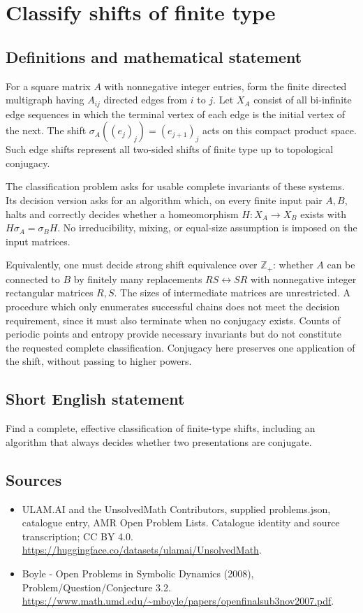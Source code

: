 \documentclass[11pt,a4paper]{article}
\begin{document}
\section*{Classify shifts of finite type}\label{statement}

\subsection{Definitions and mathematical statement}
For a square matrix $A$ with nonnegative integer entries, form the finite
directed multigraph having $A_{ij}$ directed edges from $i$ to $j$. Let
$X_A$ consist of all bi-infinite edge sequences in which the terminal
vertex of each edge is the initial vertex of the next. The shift
$\sigma_A((e_j)_j)=(e_{j+1})_j$ acts on this compact product space.
Such edge shifts represent all two-sided shifts of finite type up to
topological conjugacy.

The classification problem asks for usable complete invariants of these
systems. Its decision version asks for an algorithm which, on every finite
input pair $A,B$, halts and correctly decides whether a homeomorphism
$H:X_A\to X_B$ exists with $H\sigma_A=\sigma_BH$. No irreducibility,
mixing, or equal-size assumption is imposed on the input matrices.

Equivalently, one must decide strong shift equivalence over $\mathbb Z_+$:
whether $A$ can be connected to $B$ by finitely many replacements
$RS\leftrightarrow SR$ with nonnegative integer rectangular matrices $R,S$.
The sizes of intermediate matrices are unrestricted. A procedure which only
enumerates successful chains does not meet the decision requirement, since
it must also terminate when no conjugacy exists. Counts of periodic points
and entropy provide necessary invariants but do not constitute the requested
complete classification. Conjugacy here preserves one application of the
shift, without passing to higher powers.
\subsection{Short English statement}
Find a complete, effective classification of finite-type shifts, including an algorithm that always decides whether two presentations are conjugate.
\subsection{Sources}
\begin{itemize}
\item[S1] ULAM.AI and the UnsolvedMath Contributors, supplied problems.json, catalogue entry, AMR Open Problem Lists. Catalogue identity and source transcription; CC BY 4.0.
\url{https://huggingface.co/datasets/ulamai/UnsolvedMath}.
\item[S2] Boyle - Open Problems in Symbolic Dynamics (2008), Problem/Question/Conjecture 3.2. 
\url{https://www.math.umd.edu/~mboyle/papers/openfinalsub3nov2007.pdf}.
\end{itemize}
\end{document}
